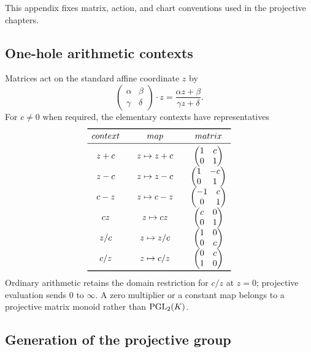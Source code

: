 This appendix fixes matrix, action, and chart conventions used in the
projective chapters.

\subsection{One-hole arithmetic contexts}

Matrices act on the standard affine coordinate $z$ by
\[
  \begin{pmatrix}\alpha&\beta\\\gamma&\delta\end{pmatrix}\cdot z
  =\frac{\alpha z+\beta}{\gamma z+\delta}.
\]
For $c\ne0$ when required, the elementary contexts have representatives
\[
\begin{array}{c@{\qquad}c@{\qquad}c}
\toprule
context & map & matrix\\
\midrule
z+c & z\mapsto z+c & \begin{pmatrix}1&c\\0&1\end{pmatrix}\\[2mm]
z-c & z\mapsto z-c & \begin{pmatrix}1&-c\\0&1\end{pmatrix}\\[2mm]
c-z & z\mapsto c-z & \begin{pmatrix}-1&c\\0&1\end{pmatrix}\\[2mm]
cz & z\mapsto cz & \begin{pmatrix}c&0\\0&1\end{pmatrix}\\[2mm]
z/c & z\mapsto z/c & \begin{pmatrix}1&0\\0&c\end{pmatrix}\\[2mm]
c/z & z\mapsto c/z & \begin{pmatrix}0&c\\1&0\end{pmatrix}\\
\bottomrule
\end{array}
\]
Ordinary arithmetic retains the domain restriction for $c/z$ at $z=0$;
projective evaluation sends $0$ to $\infty$.  A zero multiplier or a constant
map belongs to a projective matrix monoid rather than $\operatorname{PGL}_2(K)$.

\subsection{Generation of the projective group}

